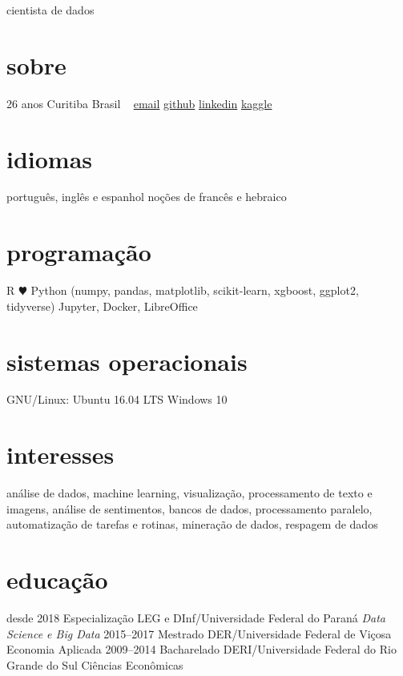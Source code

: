 \documentclass[]{friggeri-cv}
\begin{document}
       {cientista de dados}


\begin{aside}
  \section{sobre}
    26 anos
    Curitiba
    Brasil
    ~
    \href{mailto:jt\_anchante@hotmail.com}{email}
    \href{https://github.com/jayme-anchante/}{github}
    \href{https://www.linkedin.com/in/jayme-anchante}{linkedin}
    \href{https://www.kaggle.com/jtanchante}{kaggle}
  \section{idiomas}
    português, inglês e espanhol
    noções de francês e hebraico
  \section{programação}
    R {\color{red} $\varheartsuit$} Python
    (numpy, pandas, matplotlib,
    scikit-learn, xgboost,
    ggplot2, tidyverse)
    Jupyter, Docker, LibreOffice
  \section{sistemas operacionais}
    GNU/Linux: Ubuntu 16.04 LTS
    Windows 10
\end{aside}

\section{interesses}

análise de dados, machine learning, visualização, processamento de texto
e imagens, análise de sentimentos, bancos de dados, processamento paralelo,
automatização de tarefas e rotinas, mineração de dados, respagem de dados

\section{educação}

\begin{entrylist}
  \entry
    {desde 2018}
    {Especialização}
    {LEG e DInf/Universidade Federal do Paraná}
    {\emph{Data Science e Big Data}}
  \entry
    {2015–2017}
    {Mestrado}
    {DER/Universidade Federal de Viçosa}
    {Economia Aplicada}
  \entry
    {2009–2014}
    {Bacharelado}
    {DERI/Universidade Federal do Rio Grande do Sul}
    {Ciências Econômicas}
\end{entrylist}
\end{document}
